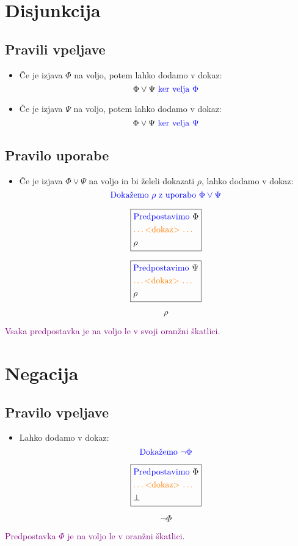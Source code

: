 \documentclass[12pt,a4paper]{article}
\newcommand{\blue}[1]{\textcolor{blue}{#1}}
\newcommand{\orange}[1]{\textcolor{orange}{#1}}
\newcommand{\purple}[1]{\textcolor{purple}{#1}}
\newcommand{\dokaz}{\orange{\text{\ldots <dokaz> \ldots}}}
\newcommand{\skatlica}[1]{
    \begin{equation*}
        \boxed{
        \begin{aligned}
            #1
        \end{aligned}
        }
    \end{equation*}
}
\begin{document}
\section{Disjunkcija}
    \subsection*{Pravili vpeljave}
    \begin{itemize}
        \item Če je izjava $\Phi$ na voljo, potem lahko dodamo v dokaz:
        $$ \Phi \vee \Psi \blue{\text{ ker velja } \Phi } $$
        \item Če je izjava $\Psi$ na voljo, potem lahko dodamo v dokaz:
        $$ \Phi \vee \Psi \blue{\text{ ker velja } \Psi } $$
    \end{itemize}

    \subsection*{Pravilo uporabe}
    \begin{itemize}
        \item Če je izjava $ \Phi \vee \Psi $ na voljo in bi želeli dokazati $ \rho $, lahko dodamo v dokaz:
        $$ \blue{\text{Dokažemo } \rho \text{ z uporabo } \Phi \vee \Psi } $$
        \skatlica{
            &\blue{\text{Predpostavimo }} \Phi \\
            &\orange{\text{\ldots <dokaz> \ldots}} \\
            &\rho 
        }
        \skatlica{
            &\blue{\text{Predpostavimo }} \Psi \\
            &\orange{\text{\ldots <dokaz> \ldots}} \\
            &\rho 
        }
        $$ \rho $$
    \end{itemize}
    \noindent \purple{Vsaka predpostavka je na voljo le v svoji oranžni škatlici.}

\section{Negacija}
    \subsection*{Pravilo vpeljave}
    \begin{itemize}
        \item Lahko dodamo v dokaz:
        $$   \blue{\text{Dokažemo } \neg \Phi  }   $$
        \skatlica{
            &\blue{\text{Predpostavimo }} \Phi \\
            &\dokaz \\
            &\bot 
        }
        $$ \neg \Phi $$
    \end{itemize}
    \purple{Predpostavka $ \Phi $ je na voljo le v oranžni škatlici.}
\end{document}
